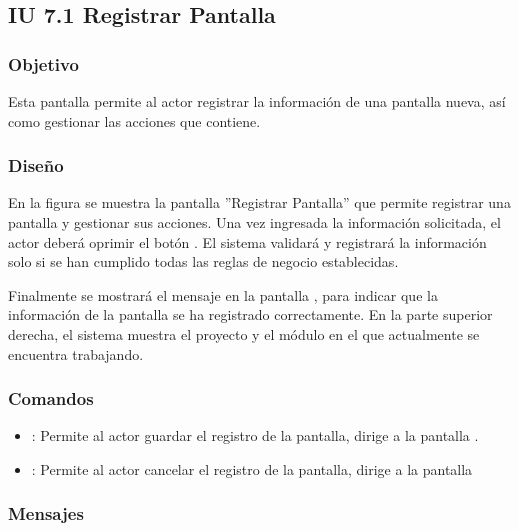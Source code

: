 \subsection{IU 7.1 Registrar Pantalla}

\subsubsection{Objetivo}
	Esta pantalla permite al actor registrar la información de una pantalla nueva, así como gestionar las acciones que contiene.
\subsubsection{Diseño}
	En la figura  se muestra la pantalla ''Registrar Pantalla'' que permite registrar una pantalla y gestionar sus acciones.
	Una vez ingresada la información solicitada, el actor deberá oprimir el botón  . El sistema validará y registrará la información solo si se han cumplido todas las reglas de negocio establecidas.
	
	Finalmente se mostrará el mensaje  en la pantalla , para indicar que la información de la pantalla se ha registrado correctamente.
	En la parte superior derecha, el sistema muestra el proyecto y el módulo en el que actualmente se encuentra trabajando.

\subsubsection{Comandos}
\begin{itemize}
	\item {}: Permite al actor guardar el registro de la pantalla, dirige a la pantalla .
	\item {}: Permite al actor cancelar el registro de la pantalla, dirige a la pantalla 
\end{itemize}

\subsubsection{Mensajes}

